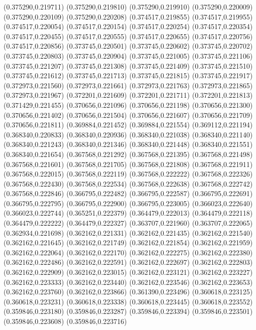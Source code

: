 (0.375290,0.219711)
(0.375290,0.219810)
(0.375290,0.219910)
(0.375290,0.220009)
(0.375290,0.220109)
(0.375290,0.220208)
(0.374517,0.219855)
(0.374517,0.219955)
(0.374517,0.220054)
(0.374517,0.220154)
(0.374517,0.220254)
(0.374517,0.220354)
(0.374517,0.220455)
(0.374517,0.220555)
(0.374517,0.220655)
(0.374517,0.220756)
(0.374517,0.220856)
(0.373745,0.220501)
(0.373745,0.220602)
(0.373745,0.220702)
(0.373745,0.220803)
(0.373745,0.220904)
(0.373745,0.221005)
(0.373745,0.221106)
(0.373745,0.221207)
(0.373745,0.221308)
(0.373745,0.221409)
(0.373745,0.221510)
(0.373745,0.221612)
(0.373745,0.221713)
(0.373745,0.221815)
(0.373745,0.221917)
(0.372973,0.221560)
(0.372973,0.221661)
(0.372973,0.221763)
(0.372973,0.221865)
(0.372973,0.221967)
(0.372201,0.221609)
(0.372201,0.221711)
(0.372201,0.221813)
(0.371429,0.221455)
(0.370656,0.221096)
(0.370656,0.221198)
(0.370656,0.221300)
(0.370656,0.221402)
(0.370656,0.221504)
(0.370656,0.221607)
(0.370656,0.221709)
(0.370656,0.221811)
(0.369884,0.221452)
(0.369884,0.221554)
(0.369112,0.221194)
(0.368340,0.220833)
(0.368340,0.220936)
(0.368340,0.221038)
(0.368340,0.221140)
(0.368340,0.221243)
(0.368340,0.221346)
(0.368340,0.221448)
(0.368340,0.221551)
(0.368340,0.221654)
(0.367568,0.221292)
(0.367568,0.221395)
(0.367568,0.221498)
(0.367568,0.221601)
(0.367568,0.221705)
(0.367568,0.221808)
(0.367568,0.221911)
(0.367568,0.222015)
(0.367568,0.222119)
(0.367568,0.222222)
(0.367568,0.222326)
(0.367568,0.222430)
(0.367568,0.222534)
(0.367568,0.222638)
(0.367568,0.222742)
(0.367568,0.222846)
(0.366795,0.222482)
(0.366795,0.222587)
(0.366795,0.222691)
(0.366795,0.222795)
(0.366795,0.222900)
(0.366795,0.223005)
(0.366023,0.222640)
(0.366023,0.222744)
(0.365251,0.222379)
(0.364479,0.222013)
(0.364479,0.222118)
(0.364479,0.222222)
(0.364479,0.222327)
(0.363707,0.221960)
(0.363707,0.222065)
(0.362934,0.221698)
(0.362162,0.221331)
(0.362162,0.221435)
(0.362162,0.221540)
(0.362162,0.221645)
(0.362162,0.221749)
(0.362162,0.221854)
(0.362162,0.221959)
(0.362162,0.222064)
(0.362162,0.222170)
(0.362162,0.222275)
(0.362162,0.222380)
(0.362162,0.222486)
(0.362162,0.222591)
(0.362162,0.222697)
(0.362162,0.222803)
(0.362162,0.222909)
(0.362162,0.223015)
(0.362162,0.223121)
(0.362162,0.223227)
(0.362162,0.223333)
(0.362162,0.223440)
(0.362162,0.223546)
(0.362162,0.223653)
(0.362162,0.223760)
(0.362162,0.223866)
(0.361390,0.223496)
(0.360618,0.223125)
(0.360618,0.223231)
(0.360618,0.223338)
(0.360618,0.223445)
(0.360618,0.223552)
(0.359846,0.223180)
(0.359846,0.223287)
(0.359846,0.223394)
(0.359846,0.223501)
(0.359846,0.223608)
(0.359846,0.223716)
